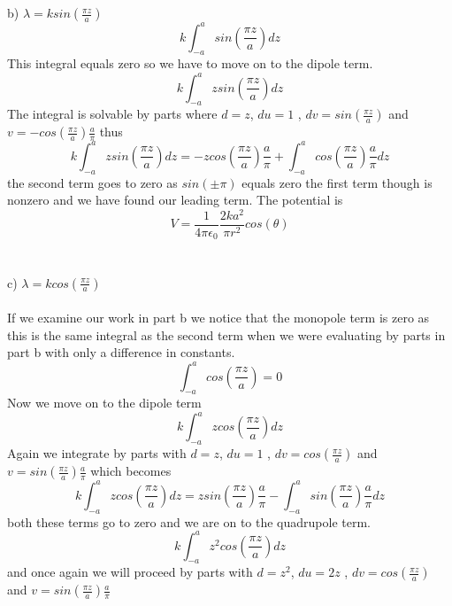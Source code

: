 \documentclass{article}
\begin{document}
\\
\\
b) $ \lambda= ksin(\frac{\pi z}{a})$
\begin{equation}
k\int_{-a}^{a}sin(\frac{\pi z}{a})dz
\end{equation}
This integral equals zero so we have to move on to the dipole term. 
\begin{equation}
k\int_{-a}^{a}zsin(\frac{\pi z}{a})dz
\end{equation}
The integral is solvable by parts where $d=z$, $du=1$ , $ dv=sin(\frac{\pi z}{a})$ and $v=-cos(\frac{\pi z}{a})\frac{a}{\pi}$
thus
\begin{equation}
k\int_{-a}^{a}zsin(\frac{\pi z}{a})dz=-zcos(\frac{\pi z}{a})\frac{a}{\pi} +\int_{-a}^{a}cos(\frac{\pi z}{a})\frac{a}{\pi}dz
\end{equation}
the second term goes to zero as $ sin(\pm\pi) $ equals zero the first term though is nonzero and we have found our leading term. 
The potential is 
\begin{equation}
V=\frac{1}{4\pi\epsilon_0}\frac{2ka^2}{\pi r^2}cos(\theta)
\end{equation}
\\
\\
c) $ \lambda= kcos(\frac{\pi z}{a})$\\
\\
If we examine our work in part b  we notice that the monopole term is zero as this is the same integral as the second term when we were evaluating by parts in  part b with only a difference in constants.
\begin{equation}
\int_{-a}^{a}cos(\frac{\pi z}{a})
=
0
\end{equation}
Now we move on to the dipole term
\begin{equation}
k\int_{-a}^{a}zcos(\frac{\pi z}{a})dz
\end{equation}
Again we integrate by parts with $d=z$, $du=1$ , $ dv=cos(\frac{\pi z}{a})$ and $v=sin(\frac{\pi z}{a})\frac{a}{\pi}$
which becomes
\begin{equation}
k\int_{-a}^{a}zcos(\frac{\pi z}{a})dz=zsin(\frac{\pi z}{a})\frac{a}{\pi} -\int_{-a}^{a}sin(\frac{\pi z}{a})\frac{a}{\pi}dz
\end{equation}
both these terms go to zero and we are on to the quadrupole term.
\begin{equation}
k\int_{-a}^{a}z^2cos(\frac{\pi z}{a})dz
\end{equation}
and once again we will proceed by parts  with $d=z^2$, $du=2z$ , $ dv=cos(\frac{\pi z}{a})$ and $v=sin(\frac{\pi z}{a})\frac{a}{\pi}$
\end{document}
